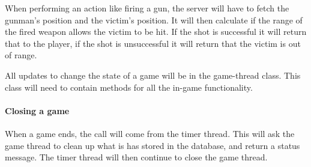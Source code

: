 When performing an action like firing a gun, the server will have to fetch the gunman's position and the victim's position. It will then calculate if the range of the fired weapon allows the victim to be hit. If the shot is successful it will return that to the player, if the shot is unsuccessful it will return that the victim is out of range. 

All updates to change the state of a game will be in the game-thread class. This class will need to contain methods for all the in-game functionality. 

\paragraph{Closing a game}
When a game ends, the call will come from the timer thread. This will ask the game thread to clean up what is has stored in the database, and return a status message. The timer thread will then continue to close the game thread. 